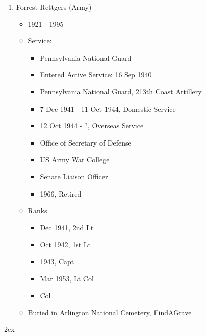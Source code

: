 \documentclass[11pt,letter]{book}
\begin{document}
\begin{enumerate}
\item Forrest Rettgers (Army)
\begin{itemize}
\item 1921 - 1995
\item Service:
\begin{itemize}
\item Pennsylvania National Guard
\item Entered Active Service:  16 Sep 1940
\item Pennsylvania National Guard, 213th Coast Artillery
\item 7 Dec 1941 - 11 Oct 1944, Domestic Service
\item 12 Oct 1944 - ?, Overseas Service
\item Office of Secretary of Defense
\item US Army War College
\item Senate Liaison Officer
\item 1966, Retired
\end{itemize}
\item Ranks
\begin{itemize}
\item Dec 1941, 2nd Lt
\item Oct 1942, 1st Lt
\item 1943, Capt
\item Mar 1953, Lt Col
\item Col
\end{itemize}
\item Buried in Arlington National Cemetery, FindAGrave
\end{itemize}

\end{enumerate}

\newpage
\begingroup
\parindent 0pt
\parskip 2ex
\def\enotesize{\normalsize}
\theendnotes
\endgroup
\end{document}
